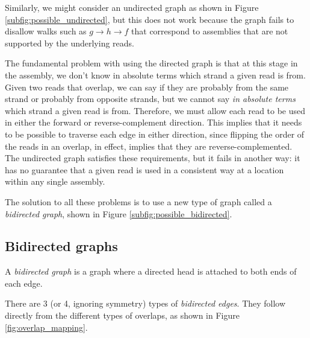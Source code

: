 \documentclass[12pt]{article}
\newcommand{\Figure}[1]{Figure \ref{#1}}
\newcommand{\Subfigure}[1]{Figure \ref{#1}}
\newcommand{\KeyTerm}[1]{{\it #1}}
\begin{document}
Similarly, we might consider an undirected graph as shown in
\Subfigure{subfig:possible_undirected}, but this does not work because
the graph fails to disallow walks such as $g \to h \to f$ that correspond to
assemblies that are not supported by the underlying reads.

The fundamental problem with using the directed graph is that at this stage in
the assembly, we don't know in absolute terms which strand a given read is from.
Given two reads that overlap, we can say if they are probably from the same
strand or probably from opposite strands, but we cannot say {\em in absolute
terms} which strand a given read is from.  Therefore, we must allow each read to
be used in either the forward or reverse-complement direction.  This implies
that it needs to be possible to traverse each edge in either direction, since
flipping the order of the reads in an overlap, in effect, implies that they are
reverse-complemented.  The undirected graph satisfies these requirements, but it
fails in another way: it has no guarantee that a given read is used in a
consistent way at a location within any single assembly.

The solution to all these problems is to use a new type of graph called a
\KeyTerm{bidirected graph}, shown in \Subfigure{subfig:possible_bidirected}.

\subsection{Bidirected graphs}

A \KeyTerm{bidirected graph} is a graph where a directed head is attached to both
ends of each edge.

There are 3 (or 4, ignoring symmetry) types of \KeyTerm{bidirected edges}.  They
follow directly from the different types of overlaps, as shown in
\Figure{fig:overlap_mapping}.
\end{document}
